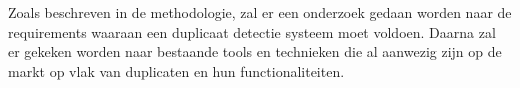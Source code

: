 
\chapter{}%
\label{ch:Onderzoek}

Zoals beschreven in de methodologie, zal er een onderzoek gedaan worden naar de requirements waaraan een duplicaat detectie systeem moet voldoen. Daarna zal er gekeken worden naar bestaande tools en technieken die al aanwezig zijn op de markt op vlak van duplicaten en hun functionaliteiten. 

\section{}%
\label{sec:requirementsanalyse}

